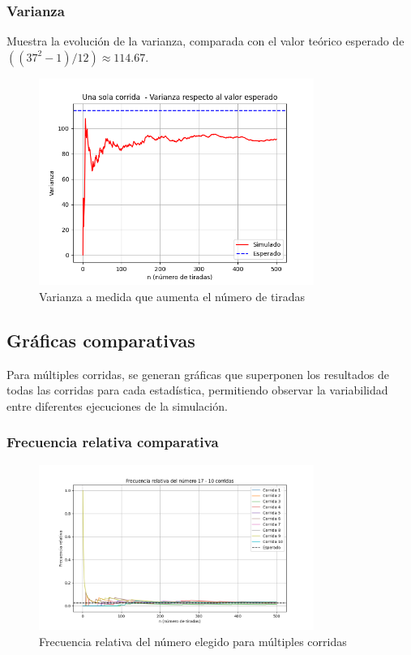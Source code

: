 \documentclass{article}
\begin{document}
\subsubsection{Varianza}
Muestra la evolución de la varianza, comparada con el valor teórico esperado de $((37^2-1)/12) \approx 114.67$.
\begin{figure}
  \centering
  \includegraphics[width=0.8\textwidth]{grafica_varianza.png}
  \caption{Varianza a medida que aumenta el número de tiradas}
  \label{fig:varianza_individual}
\end{figure}

\subsection{Gráficas comparativas}
Para múltiples corridas, se generan gráficas que superponen los resultados de todas las corridas para cada estadística, permitiendo observar la variabilidad entre diferentes ejecuciones de la simulación.

\subsubsection{Frecuencia relativa comparativa}
\begin{figure}
  \centering
  \includegraphics[width=0.8\textwidth]{grafica_frecuencia_todas.png}
  \caption{Frecuencia relativa del número elegido para múltiples corridas}
  \label{fig:frecuencia}
\end{figure}
\end{document}
